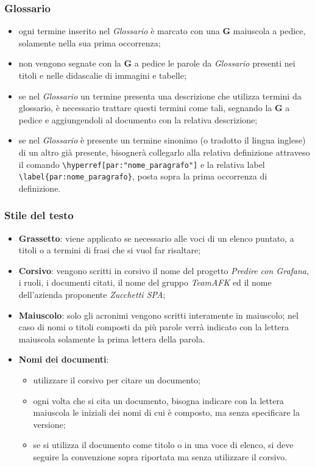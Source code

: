 \subsubsection{Glossario}
\begin{itemize}
\item ogni termine inserito nel \textit{Glossario} è marcato con una \textbf{G} maiuscola a pedice, solamente nella sua prima occorrenza;
\item non vengono segnate con la \textbf{G} a pedice le parole da \textit{Glossario} presenti nei titoli e nelle didascalie di immagini e tabelle;
\item se nel \textit{Glossario} un termine presenta una descrizione che utilizza termini da glossario, è necessario trattare questi termini come tali, segnando la \textbf{G} a pedice e aggiungendoli al documento con la relativa descrizione;
\item se nel \textit{Glossario} è presente un termine sinonimo (o tradotto il lingua inglese) di un altro già presente, bisognerà collegarlo alla relativa definizione attraveso il comando \verb|\hyperref[par:"nome_paragrafo"]| e la relativa label \verb|\label{par:nome_paragrafo}|, posta sopra la prima occorrenza di definizione.
\end{itemize}

\subsubsection{Stile del testo}
\begin{itemize}
\item \textbf{Grassetto}: viene applicato se necessario alle voci di un elenco puntato, a titoli o a termini di frasi che si vuol far risaltare;
\item \textbf{Corsivo}: vengono scritti in corsivo il nome del progetto \textit{Predire con Grafana}, i ruoli, i documenti citati, il nome del gruppo \textit{TeamAFK} ed il nome dell'azienda proponente \textit{Zucchetti SPA};
\item \textbf{Maiuscolo}: solo gli acronimi vengono scritti interamente in maiuscolo; nel caso di nomi o titoli composti da più parole verrà indicato con la lettera maiuscola solamente la prima lettera della parola.
\item \textbf{Nomi dei documenti}: 
\begin{itemize}
\item utilizzare il corsivo per citare un documento;
\item ogni volta che si cita un documento, bisogna indicare con la lettera maiuscola le iniziali dei nomi di cui è composto, ma senza specificare la versione;
\item se si utilizza il documento come titolo o in una voce di elenco, si deve seguire la convenzione sopra riportata ma senza utilizzare il corsivo. 
\end{itemize}
\end{itemize}

